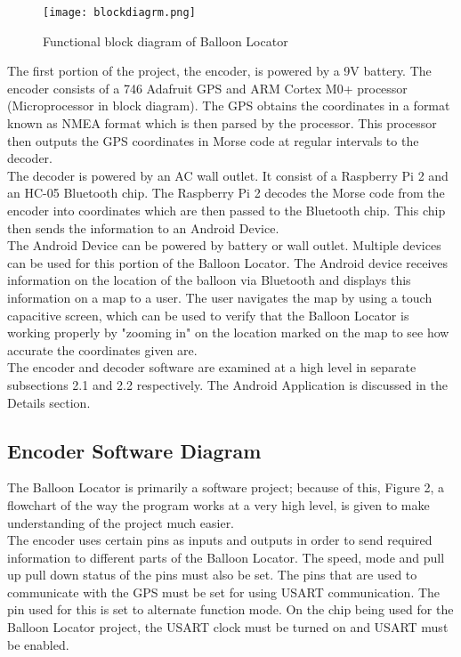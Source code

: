 \documentclass[12pt, letterpaper]{article}
\begin{document}
\begin{figure}[H]
    \centering
    \texttt{[image: blockdiagrm.png]}
    \caption{Functional block diagram of Balloon Locator}
    \label{Ass0}
\end{figure}

The first portion of the project, the encoder, is powered by a 9V battery. The encoder consists of a 746 Adafruit GPS and ARM Cortex M0+ processor (Microprocessor in block diagram). The GPS obtains the coordinates in a format known as NMEA format which is then parsed by the processor. This processor then outputs the GPS coordinates in Morse code at regular intervals to the decoder.\\


The decoder is powered by an AC wall outlet. It consist of a Raspberry Pi 2 and an HC-05 Bluetooth chip. The Raspberry Pi 2 decodes the Morse code from the encoder into coordinates which are then passed to the Bluetooth chip. This chip then sends the information to an Android Device.\\

The Android Device can be powered by battery or wall outlet. Multiple devices can be used for this portion of the Balloon Locator. The Android device receives information on the location of the balloon via Bluetooth and displays this information on a map to a user. The user navigates the map by using a touch capacitive screen, which can be used to verify that the Balloon Locator is working properly by "zooming in" on the location marked on the map to see how accurate the coordinates given are.\\

The encoder and decoder software are examined at a high level in separate subsections 2.1 and 2.2 respectively. The Android Application is discussed in the Details section.

\subsection{Encoder Software Diagram}
The Balloon Locator is primarily a software project; because of this, Figure 2, a flowchart of the way the program works at a very high level, is given to make understanding of the project much easier. \\

The encoder uses certain pins as inputs and outputs in order to send required information to different parts of the Balloon Locator. The speed, mode and pull up pull down status of the pins must also be set. The pins that are used to communicate with the GPS must be set for using USART communication. The pin used for this is set to alternate function mode. On the chip being used for the Balloon Locator project, the USART clock must be turned on and USART must be enabled. \\
\end{document}
